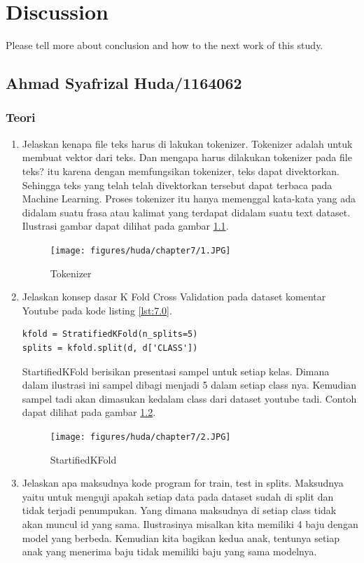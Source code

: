 \chapter{Discussion}
Please tell more about conclusion and how to the next work of this study.

\section{Ahmad Syafrizal Huda/1164062}
\subsection{Teori}
\begin{enumerate}
\item Jelaskan kenapa file teks harus di lakukan tokenizer.
\subitem Tokenizer adalah untuk membuat vektor dari teks. Dan mengapa harus dilakukan tokenizer pada file teks? itu karena dengan memfungsikan tokenizer, teks dapat divektorkan. Sehingga teks yang telah telah divektorkan tersebut dapat terbaca pada Machine Learning. Proses tokenizer itu hanya memenggal kata-kata yang ada didalam suatu frasa atau kalimat yang terdapat didalam suatu text dataset. Ilustrasi gambar dapat dilihat pada gambar \ref{c7_1}.
\begin{figure}[!htbp]
	\centerline{\texttt{[image: figures/huda/chapter7/1.JPG]}}
	\caption{Tokenizer}
	\label{c7_1}
\end{figure}
\item Jelaskan konsep dasar K Fold Cross Validation pada dataset komentar Youtube pada kode listing \ref{lst:7.0}.
\begin{lstlisting}[caption=K Fold Cross Validation,label={lst:7.0}]
kfold = StratifiedKFold(n_splits=5)
splits = kfold.split(d, d['CLASS'])
\end{lstlisting}
\subitem StartifiedKFold berisikan presentasi sampel untuk setiap kelas. Dimana dalam ilustrasi ini sampel dibagi menjadi 5 dalam setiap class nya. Kemudian sampel tadi akan dimasukan kedalam class dari dataset youtube tadi. Contoh dapat dilihat pada gambar \ref{c7_2}.
\begin{figure}[!htbp]
	\centerline{\texttt{[image: figures/huda/chapter7/2.JPG]}}
	\caption{StartifiedKFold}
	\label{c7_2}
\end{figure}
\item Jelaskan apa maksudnya kode program for train, test in splits.
\subitem Maksudnya yaitu untuk menguji apakah setiap data pada dataset sudah di split dan tidak terjadi penumpukan. Yang dimana maksudnya di setiap class tidak akan muncul id yang sama. Ilustrasinya misalkan kita memiliki 4 baju dengan model yang berbeda. Kemudian kita bagikan kedua anak, tentunya setiap anak yang menerima baju tidak memiliki baju yang sama modelnya.

\end{enumerate}
